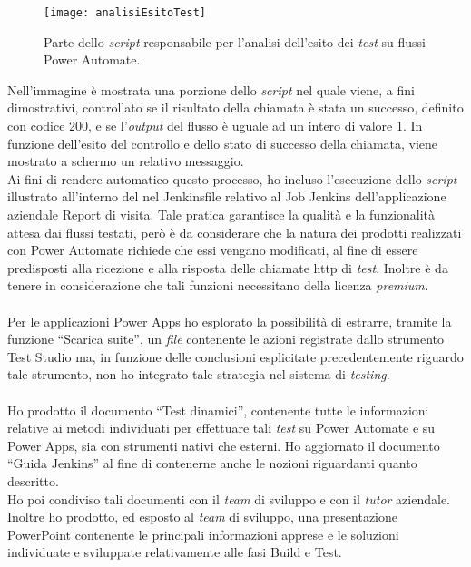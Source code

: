 \begin{figure}[htbp] 
    \centering 
    \texttt{[image: analisiEsitoTest]} 
    \caption{Parte dello \emph{script} responsabile per l'analisi dell'esito dei \emph{test} su flussi Power Automate.}
    \label{fig:analisiEsitoTest}
\end{figure}
\newline Nell'immagine è mostrata una porzione dello \emph{script} nel quale viene, a fini dimostrativi, controllato se il risultato della chiamata è stata un successo, definito con codice 200, e se l'\emph{output} del flusso è uguale ad un intero di valore 1.
In funzione dell'esito del controllo e dello stato di successo della chiamata, viene mostrato a schermo un relativo messaggio.\\
Ai fini di rendere automatico questo processo, ho incluso l'esecuzione dello \emph{script} illustrato all'interno del nel Jenkinsfile relativo al Job Jenkins dell'applicazione aziendale Report di visita.
Tale pratica garantisce la qualità e la funzionalità attesa dai flussi testati, però è da considerare che la natura dei prodotti realizzati con Power Automate richiede che essi vengano modificati, al fine di essere predisposti alla ricezione e alla risposta delle chiamate \gls{http} di \emph{test}.
Inoltre è da tenere in considerazione che tali funzioni necessitano della licenza \emph{premium}.\\\\
Per le applicazioni Power Apps ho esplorato la possibilità di estrarre, tramite la funzione “Scarica suite”, un \emph{file} contenente le azioni registrate dallo strumento Test Studio ma, in funzione delle conclusioni esplicitate precedentemente riguardo tale strumento, non ho integrato tale strategia nel sistema di \emph{testing}.\\\\
Ho prodotto il documento “Test dinamici”, contenente tutte le informazioni relative ai metodi individuati per effettuare tali \emph{test} su Power Automate e su Power Apps, sia con strumenti nativi che esterni. Ho aggiornato il documento “Guida Jenkins” al fine di contenerne anche le nozioni riguardanti quanto descritto.\\
Ho poi condiviso tali documenti con il \emph{team} di sviluppo e con il \emph{\emph{tutor}} aziendale.\\
Inoltre ho prodotto, ed esposto al \emph{team} di sviluppo, una presentazione PowerPoint contenente le principali informazioni apprese e le soluzioni individuate e sviluppate relativamente alle fasi Build e Test. 

